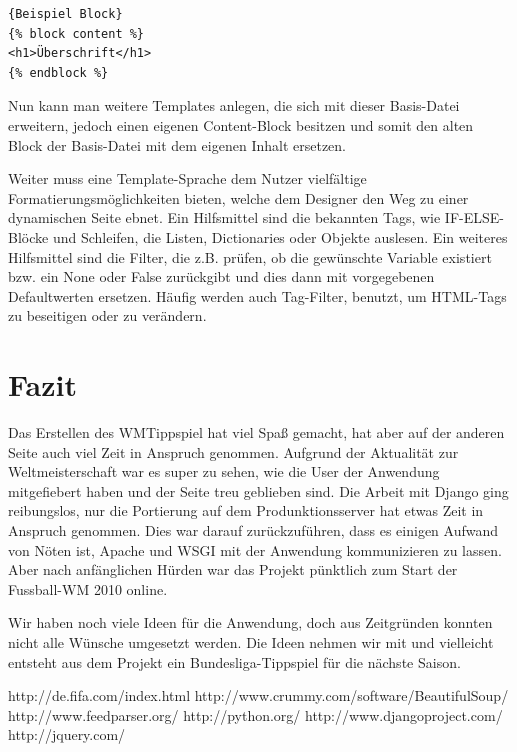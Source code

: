 \begin{lstlisting}[caption=Beispiel]{Beispiel Block}
{% block content %}
<h1>Überschrift</h1>
{% endblock %}
\end{lstlisting}
 
Nun kann man weitere Templates anlegen, die sich mit dieser Basis-Datei 
erweitern, jedoch einen eigenen Content-Block besitzen und somit den alten
Block der Basis-Datei mit dem eigenen Inhalt ersetzen.

Weiter muss eine Template-Sprache dem Nutzer vielfältige 
Formatierungsmöglichkeiten bieten, welche dem Designer den Weg zu einer 
dynamischen Seite ebnet. Ein Hilfsmittel sind die bekannten Tags, wie 
IF-ELSE-Blöcke und Schleifen, die Listen, Dictionaries oder Objekte auslesen. 
Ein weiteres Hilfsmittel sind die Filter, die z.B. prüfen, ob die gewünschte 
Variable existiert bzw. ein None oder False zurückgibt und dies dann mit 
vorgegebenen Defaultwerten ersetzen. Häufig werden auch Tag-Filter, benutzt, um 
HTML-Tags zu beseitigen oder zu verändern.


\chapter{Fazit}
Das Erstellen des WMTippspiel hat viel Spaß gemacht, hat aber auf der
anderen Seite auch viel Zeit in Anspruch genommen. Aufgrund der Aktualität zur
Weltmeisterschaft war es super zu sehen, wie die User der Anwendung
mitgefiebert haben und der Seite treu geblieben sind. Die Arbeit mit Django ging
reibungslos, nur die Portierung auf dem Produnktionsserver hat etwas Zeit in 
Anspruch genommen. Dies war darauf zurückzuführen, dass es einigen Aufwand von Nöten ist, Apache und WSGI mit der
Anwendung kommunizieren zu lassen. Aber nach anfänglichen Hürden war das 
Projekt pünktlich zum Start der Fussball-WM 2010 online.

Wir haben noch viele Ideen für die Anwendung, doch aus Zeitgründen konnten
nicht alle Wünsche umgesetzt werden. Die Ideen nehmen wir mit und vielleicht
entsteht aus dem Projekt ein Bundesliga-Tippspiel für die nächste Saison. 



\begin{thebibliography}{99}
http://de.fifa.com/index.html
http://www.crummy.com/software/BeautifulSoup/
http://www.feedparser.org/
http://python.org/
http://www.djangoproject.com/
http://jquery.com/
\end{thebibliography}



